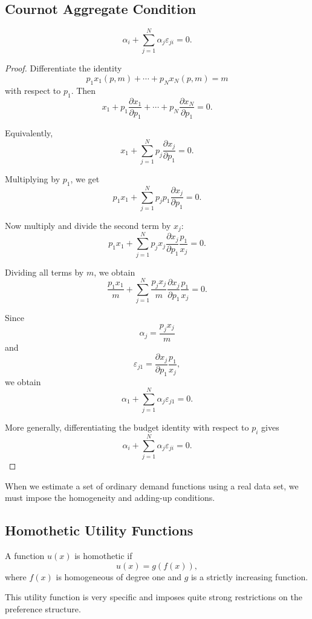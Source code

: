 \subsection{Cournot Aggregate Condition}

\begin{condition}
\[
\alpha_i + \sum_{j=1}^N \alpha_j \varepsilon_{ji}=0.
\]
\end{condition}

\begin{proof}
Differentiate the identity
\[
p_1x_1(p,m)+\cdots+p_Nx_N(p,m)=m
\]
with respect to \(p_1\). Then
\[
x_1
+
p_1\frac{\partial x_1}{\partial p_1}
+
\cdots
+
p_N\frac{\partial x_N}{\partial p_1}
=
0.
\]

Equivalently,
\[
x_1
+
\sum_{j=1}^N p_j\frac{\partial x_j}{\partial p_1}
=
0.
\]

Multiplying by \(p_1\), we get
\[
p_1x_1
+
\sum_{j=1}^N p_jp_1\frac{\partial x_j}{\partial p_1}
=
0.
\]

Now multiply and divide the second term by \(x_j\):
\[
p_1x_1
+
\sum_{j=1}^N
p_jx_j
\frac{\partial x_j}{\partial p_1}
\frac{p_1}{x_j}
=
0.
\]

Dividing all terms by \(m\), we obtain
\[
\frac{p_1x_1}{m}
+
\sum_{j=1}^N
\frac{p_jx_j}{m}
\frac{\partial x_j}{\partial p_1}
\frac{p_1}{x_j}
=
0.
\]

Since
\[
\alpha_j
=
\frac{p_jx_j}{m}
\]
and
\[
\varepsilon_{j1}
=
\frac{\partial x_j}{\partial p_1}
\frac{p_1}{x_j},
\]
we obtain
\[
\alpha_1+\sum_{j=1}^N \alpha_j\varepsilon_{j1}=0.
\]

More generally, differentiating the budget identity with respect to \(p_i\) gives
\[
\alpha_i+\sum_{j=1}^N \alpha_j\varepsilon_{ji}=0.
\]
\end{proof}

When we estimate a set of ordinary demand functions using a real data set, we must impose the homogeneity and adding-up conditions.

\subsection{Homothetic Utility Functions}

A function \(u(x)\) is homothetic if
\[
u(x)=g(f(x)),
\]
where \(f(x)\) is homogeneous of degree one and \(g\) is a strictly increasing function.

This utility function is very specific and imposes quite strong restrictions on the preference structure.

